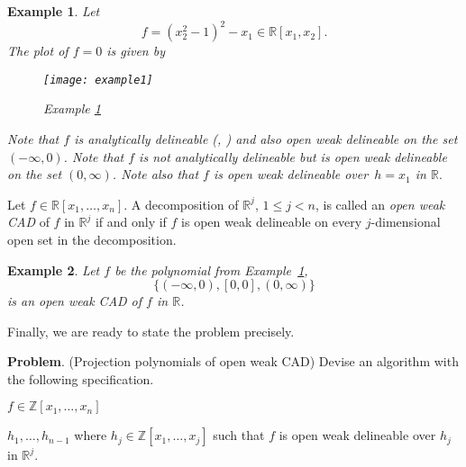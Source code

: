 \documentclass[amsthm]{elsart}
\def \RR {{\mathbb R}}
\def \ZZ {{\mathbb Z}}
\newtheorem{ex}{Example}   \renewcommand{\algorithmicrequire}{\textsf{Input:}}
\begin{document}
\begin{ex}\label{ex:wod}
Let $$f=(x_2^2-1)^2-x_1\in \RR[x_1,x_2].$$
The plot of $f=0$ is given by
\begin{figure}[ht]
\begin{centering}
        \texttt{[image: example1]}
\caption{Example \ref{ex:wod}\label{fig:ex21} }
\end{centering}
\end{figure}

\noindent
Note that $f$ is analytically delineable (\citet{collins1}, \citet{McCallum2}) and also open weak delineable on the set $(-\infty, 0)$.
Note that $f$ is {\em not\/} analytically delineable  but {\em is\/} open weak delineable on the set $(0,\infty)$. Note also that $f$ is open weak delineable over~$h=x_1$ in $\RR.$
\end{ex}





\begin{defn}
Let $f\in \RR[x_1,\ldots,x_n]$. A decomposition of $\RR^j$, $1\leq j< n$, is called an {\em open weak CAD\/} of $f$ in $\RR^j$ if and only if $f$ is open weak delineable on every $j$-dimensional open set in the decomposition. \end{defn}

\begin{ex}
Let $f$ be the  polynomial from Example~\ref{ex:wod}, \[\{(-\infty,0),[0,0],(0,\infty)\}\]
is an open weak CAD of $f$ in $\RR$.
\end{ex}

Finally, we are ready to state the problem precisely.\medskip

\noindent \textbf{Problem}. (Projection polynomials of open weak CAD) Devise an algorithm with the following specification.
\medskip
\begin{description}[leftmargin=3em,style=nextline,itemsep=0.5em]
\item[\sf In:]   $f\in \ZZ[x_1,\ldots,x_n]$
\item[\sf Out:]  $h_1, \ldots, h_{n-1}$ where $h_j\in \ZZ[x_1,\ldots,x_j]$
such that $f$ is open weak delineable over $h_j$ in $\RR^j$.
\end{description}
\end{document}
